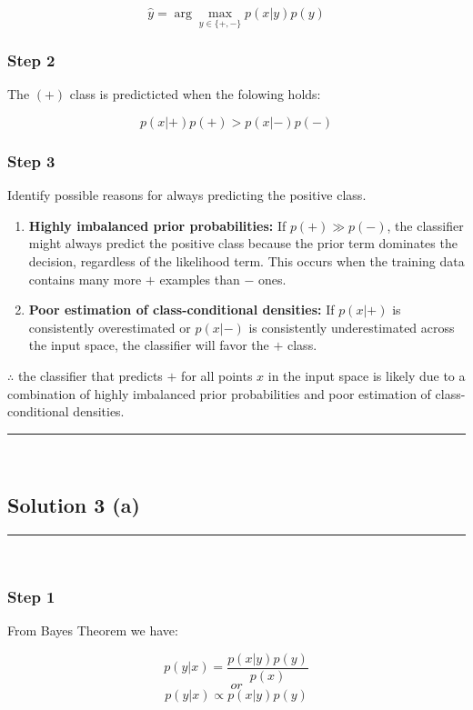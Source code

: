\documentclass{article}
\begin{document}
$$\hat{y} = \arg\max_{y \in \{+,-\}} p(x|y)p(y)$$

\subsubsection*{Step 2}

\parbox{\textwidth}{The $(+)$ class is predicticted when the folowing holds:}

\vspace{0.2cm}

$$p(x|+)p(+) > p(x|-)p(-)$$

\subsubsection*{Step 3} 

\parbox{\textwidth}{Identify possible reasons for always predicting the positive class.}

\vspace{0.2cm}

\begin{enumerate}
    \item \textbf{Highly imbalanced prior probabilities:} If $p(+) \gg p(-)$, the classifier might always predict the positive class because the prior term dominates the decision, regardless of the likelihood term. This occurs when the training data contains many more $+$ examples than $-$ ones.
    
    \item \textbf{Poor estimation of class-conditional densities:} If $p(x|+)$ is consistently overestimated or $p(x|-)$ is consistently underestimated across the input space, the classifier will favor the $+$ class.
\end{enumerate}

\parbox{\textwidth}{$\therefore$ the classifier that predicts $+$ for all points $x$ in the input space is likely due to a combination of highly imbalanced prior probabilities and poor estimation of class-conditional densities.}
\noindent\rule{\textwidth}{0.4pt}\\

\newpage

\subsection*{Solution 3 (a)}

\noindent\rule{\textwidth}{0.4pt}\\

\subsubsection*{Step 1}
\parbox{\textwidth}{From Bayes Theorem we have:}
$$p(y|x) = \frac{p(x|y)p(y)}{p(x)}$$
$$or$$
$$p(y|x) \propto p(x|y)p(y)$$
\end{document}

